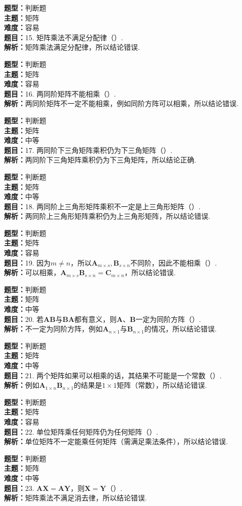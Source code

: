 \documentclass{ctexart}
\newenvironment{question}[5]{%
	\noindent\textbf{题型：}#1\\
	\textbf{主题：}#2\\
	\textbf{难度：}#3\\
	\textbf{题目：}#4\\
	\textbf{解析：}#5\\
	\vspace{1em}
}{}
\begin{document}
	\begin{question}
		{判断题}
		{矩阵}
		{容易}
		{15. 矩阵乘法不满足分配律（）.}
		{矩阵乘法满足分配律，所以结论错误.}
	\end{question}
	
	\begin{question}
		{判断题}
		{矩阵}
		{容易}
		{16. 两同阶矩阵不能相乘（）.}
		{两同阶矩阵不一定不能相乘，例如同阶方阵可以相乘，所以结论错误.}
	\end{question}
	
	\begin{question}
		{判断题}
		{矩阵}
		{中等}
		{17. 两同阶下三角矩阵乘积仍为下三角矩阵（）.}
		{两同阶下三角矩阵乘积仍为下三角矩阵，所以结论正确.}
	\end{question}
	
	\begin{question}
		{判断题}
		{矩阵}
		{中等}
		{18. 两同阶上三角形矩阵乘积不一定是上三角形矩阵（）.}
		{两同阶上三角形矩阵乘积仍为上三角形矩阵，所以结论错误.}
	\end{question}
	
	\begin{question}
		{判断题}
		{矩阵}
		{容易}
		{19. 因为\(m \neq n\)，所以\(\mathbf{A}_{m \times s}, \mathbf{B}_{s \times n}\)不同阶，因此不能相乘（）.}
		{可以相乘，\(\mathbf{A}_{m \times s}\mathbf{B}_{s \times n}=\mathbf{C}_{m \times n}\)，所以结论错误.}
	\end{question}
	
	\begin{question}
		{判断题}
		{矩阵}
		{中等}
		{20. 若\(\mathbf{AB}\)与\(\mathbf{BA}\)都有意义，则\(\mathbf{A}\)、\(\mathbf{B}\)一定为同阶方阵（）.}
		{不一定为同阶方阵，例如\(\mathbf{A}_{n \times 1}\)与\(\mathbf{B}_{n \times 1}\)的情况，所以结论错误.}
	\end{question}
	
	\begin{question}
		{判断题}
		{矩阵}
		{中等}
		{21. 两个矩阵如果可以相乘的话，其结果不可能是一个常数（）.}
		{例如\(\mathbf{A}_{1 \times n}\mathbf{B}_{n \times 1}\)的结果是\(1\times1\)矩阵（常数），所以结论错误.}
	\end{question}
	
	\begin{question}
		{判断题}
		{矩阵}
		{容易}
		{22. 单位矩阵乘任何矩阵仍为任何矩阵（）.}
		{单位矩阵不一定能乘任何矩阵（需满足乘法条件），所以结论错误.}
	\end{question}
	
	\begin{question}
		{判断题}
		{矩阵}
		{中等}
		{23. \(\mathbf{AX}=\mathbf{AY}\)，则\(\mathbf{X}=\mathbf{Y}\)（）.}
		{矩阵乘法不满足消去律，所以结论错误.}
	\end{question}
	
\end{document}
